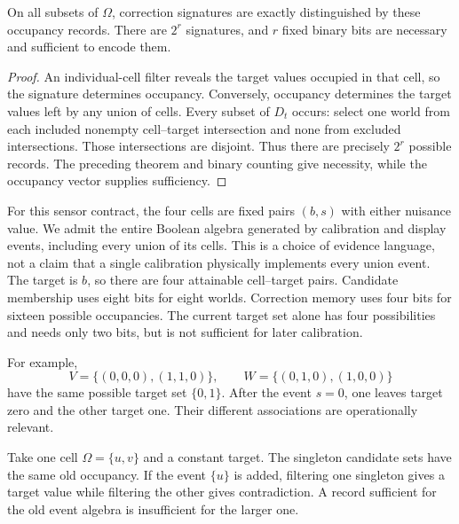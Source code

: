 \begin{Corecorollary}\label{Core:r:occupancy}
On all subsets of $\Omega$, correction signatures are exactly distinguished by these occupancy records. There are $2^r$ signatures, and $r$ fixed binary bits are necessary and sufficient to encode them.
\end{Corecorollary}
\begin{proof}
An individual-cell filter reveals the target values occupied in that cell, so the signature determines occupancy. Conversely, occupancy determines the target values left by any union of cells. Every subset of $D_t$ occurs: select one world from each included nonempty cell--target intersection and none from excluded intersections. Those intersections are disjoint. Thus there are precisely $2^r$ possible records. The preceding theorem and binary counting give necessity, while the occupancy vector supplies sufficiency.
\end{proof}

For this sensor contract, the four cells are fixed pairs $(b,s)$ with either nuisance value. We admit the entire Boolean algebra generated by calibration and display events, including every union of its cells. This is a choice of evidence language, not a claim that a single calibration physically implements every union event. The target is $b$, so there are four attainable cell--target pairs. Candidate membership uses eight bits for eight worlds. Correction memory uses four bits for sixteen possible occupancies. The current target set alone has four possibilities and needs only two bits, but is not sufficient for later calibration.

For example,
\[
V=\{(0,0,0),(1,1,0)\},\qquad W=\{(0,1,0),(1,0,0)\}
\]
have the same possible target set $\{0,1\}$. After the event $s=0$, one leaves target zero and the other target one. Their different associations are operationally relevant.

\begin{Corecounterexample}\label{Core:ce:split}
Take one cell $\Omega=\{u,v\}$ and a constant target. The singleton candidate sets have the same old occupancy. If the event $\{u\}$ is added, filtering one singleton gives a target value while filtering the other gives contradiction. A record sufficient for the old event algebra is insufficient for the larger one.
\end{Corecounterexample}

